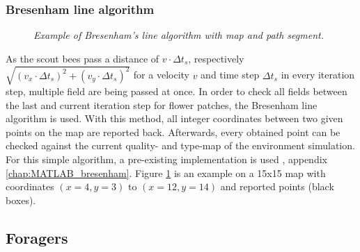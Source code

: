 	\subsubsection{Bresenham line algorithm}
		\begin{figure}
			\centering
			\caption{\textit{Example of Bresenham's line algorithm with map and path segment.}}
			\label{fig:bresenham}
		\end{figure}
		As the scout bees pass a distance of $v \cdot \Delta t_s$, respectively $\sqrt{(v_x \cdot \Delta t_s)^2 + (v_y \cdot \Delta t_s)^2}$ for a velocity $v$ and time step $\Delta t_s$ in every iteration step, multiple field are being passed at once. In order to check all fields between the last and current iteration step for flower patches, the Bresenham line algorithm is used. With this method, all integer coordinates between two given points on the map are reported back. Afterwards, every obtained point can be checked against the current quality- and type-map of the environment simulation.
		For this simple algorithm, a pre-existing implementation is used \cite{MVTB}, appendix \ref{chap:MATLAB_bresenham}. Figure \ref{fig:bresenham} is an example on a 15x15 map with coordinates $(x = 4, y = 3)$ to $(x = 12, y = 14)$ and reported points (black boxes).
\subsection{Foragers}
